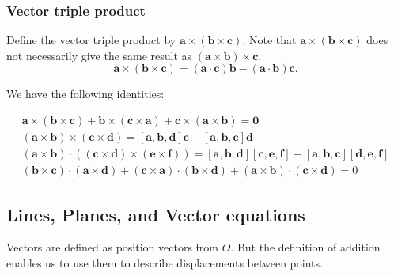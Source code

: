 \documentclass[a4paper]{article}
\begin{document}
\subsubsection{Vector triple product}
\begin{definition}
  Define the vector triple product by $ \mathbf{a}\times
  (\mathbf{b}\times \mathbf{c}) $. Note that $ \mathbf{a}\times
  (\mathbf{b}\times \mathbf{c}) $ does not necessarily give the same
  result as $ (\mathbf{a}\times \mathbf{b})\times \mathbf{c} $.
  \begin{equation}\label{eq:vector triple prod identity}
    \mathbf{a}\times (\mathbf{b}\times \mathbf{c})=(\mathbf{a}\cdot
    \mathbf{c})\mathbf{b}-(\mathbf{a}\cdot \mathbf{b})\mathbf{c}.
  \end{equation}
\end{definition}
We have the following identities:
\begin{proposition}\label{prop:triple}
  \[
    \begin{array}{l}
      \mathbf{a} \times(\mathbf{b} \times \mathbf{c})+\mathbf{b}
      \times(\mathbf{c} \times \mathbf{a})+\mathbf{c}
      \times(\mathbf{a} \times \mathbf{b})=\mathbf{0} \\
      (\mathbf{a} \times \mathbf{b}) \times(\mathbf{c} \times
      \mathbf{d})=[\mathbf{a}, \mathbf{b}, \mathbf{d}]
      \mathbf{c}-[\mathbf{a}, \mathbf{b}, \mathbf{c}] \mathbf{d} \\
      (\mathbf{a} \times \mathbf{b}) \cdot((\mathbf{c} \times
      \mathbf{d}) \times(\mathbf{e} \times \mathbf{f}))=[\mathbf{a},
      \mathbf{b}, \mathbf{d}][\mathbf{c}, \mathbf{e},
      \mathbf{f}]-[\mathbf{a}, \mathbf{b}, \mathbf{c}][\mathbf{d},
      \mathbf{e}, \mathbf{f}] \\
      (\mathbf{b} \times \mathbf{c}) \cdot(\mathbf{a} \times
      \mathbf{d})+(\mathbf{c} \times \mathbf{a}) \cdot(\mathbf{b}
      \times \mathbf{d})+(\mathbf{a} \times \mathbf{b})
      \cdot(\mathbf{c} \times \mathbf{d})=0
    \end{array}
  \]
\end{proposition}
\subsection{Lines, Planes, and Vector equations}
Vectors are defined as position vectors from $O$. But the definition
of addition enables us to use them to describe displacements between points.
\end{document}
